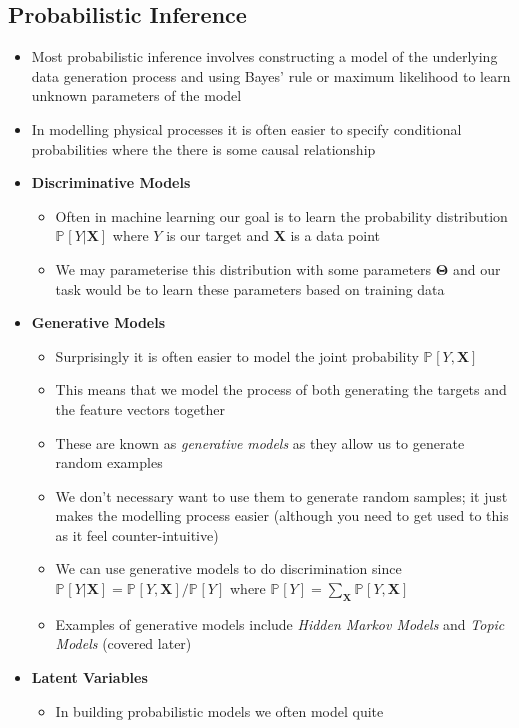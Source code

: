 \documentclass[11pt]{article}
\newcommand{\Prob}[2][]{\mathbb{P}_{#1\!}\left[ #2 \right]}
\begin{document}
\subsection{Probabilistic Inference}
\label{sec:orgfb85cd8}
\begin{itemize}
\item Most probabilistic inference involves constructing a model of the
underlying data generation process and using Bayes' rule or
maximum likelihood to learn unknown parameters of the model
\item In modelling physical processes it is often easier to specify
conditional probabilities where the there is some causal relationship
\item \textbf{Discriminative Models}
\begin{itemize}
\item Often in machine learning our goal is to learn the probability
distribution \(\Prob{Y|\bm{X}}\) where \(Y\) is our target and
\(\bm{X}\) is a data point
\item We may parameterise this distribution with some
parameters \(\bm{\Theta}\) and our task would be to learn these
parameters based on training data
\end{itemize}
\item \textbf{Generative Models}
\begin{itemize}
\item Surprisingly it is  often easier to model the joint probability
\(\Prob{Y,\bm{X}}\)
\item This means that we model the process of both generating the
targets and the feature vectors together
\item These are known as \emph{generative models} as they allow us to
generate random examples
\item We don't necessary want to use them to generate random samples;
it just makes the modelling process easier (although you need
to get used to this as it feel counter-intuitive)
\item We can use generative models to do discrimination since
\(\Prob{Y|\bm{X}} = \Prob{Y,\bm{X}}/\Prob{Y}\) where
\(\Prob{Y}=\sum_{\bm{X}} \Prob{Y,\bm{X}}\)
\item Examples of generative models include \emph{Hidden Markov Models}
and \emph{Topic Models} (covered later)
\end{itemize}
\item \textbf{Latent Variables}
\begin{itemize}
\item In building probabilistic models we often model quite

\end{itemize}
\end{itemize}
\end{document}
